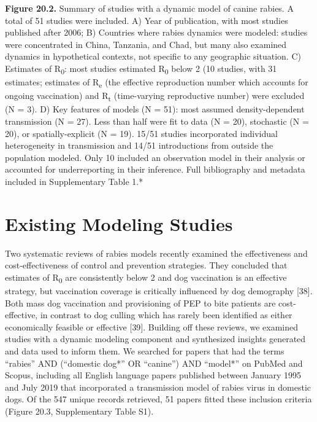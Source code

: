 \documentclass[
]{book}
\begin{document}
\textbf{Figure 20.2.} Summary of studies with a dynamic model of canine
rabies. A total of 51 studies were included. A) Year of publication,
with most studies published after 2006; B) Countries where rabies
dynamics were modeled: studies were concentrated in China, Tanzania, and
Chad, but many also examined dynamics in hypothetical contexts, not
specific to any geographic situation. C) Estimates of R\textsubscript{0}: most studies
estimated R\textsubscript{0} below 2 (10 studies, with 31 estimates; estimates of R\textsubscript{e}
(the effective reproduction number which accounts for ongoing
vaccination) and R\textsubscript{t} (time-varying reproductive number) were excluded
(N = 3). D) Key features of models (N = 51): most assumed
density-dependent transmission (N = 27). Less than half were fit to data
(N = 20), stochastic (N = 20), or spatially-explicit (N = 19). 15/51
studies incorporated individual heterogeneity in transmission and 14/51
introductions from outside the population modeled. Only 10 included an
observation model in their analysis or accounted for underreporting in
their inference. Full bibliography and metadata included in
Supplementary Table 1.*

\hypertarget{existing-modeling-studies}{%
\section{Existing Modeling Studies}\label{existing-modeling-studies}}

Two systematic reviews of rabies models recently examined the
effectiveness and cost-effectiveness of control and prevention
strategies. They concluded that estimates of R\textsubscript{0} are consistently below
2 and dog vaccination is an effective strategy, but vaccination coverage
is critically influenced by dog demography {[}38{]}. Both mass dog
vaccination and provisioning of PEP to bite patients are cost-effective,
in contrast to dog culling which has rarely been identified as either
economically feasible or effective {[}39{]}. Building off these reviews,
we examined studies with a dynamic modeling component and synthesized
insights generated and data used to inform them. We searched for papers
that had the terms ``rabies'' AND (``domestic dog*'' OR ``canine'') AND
``model*'' on PubMed and Scopus, including all English language papers
published between January 1995 and July 2019 that incorporated a
transmission model of rabies virus in domestic dogs. Of the 547 unique
records retrieved, 51 papers fitted these inclusion criteria (Figure
20.3, Supplementary Table S1).
\end{document}
